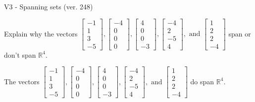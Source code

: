 \begin{exercise}
  \begin{exerciseTitle}V3 - Spanning sets (ver. 248)\end{exerciseTitle}
  \begin{exerciseStatement}
    Explain why the vectors \(\left[\begin{array}{r}
-1 \\
1 \\
3 \\
-5
\end{array}\right] , \left[\begin{array}{r}
-4 \\
0 \\
0 \\
0
\end{array}\right] , \left[\begin{array}{r}
4 \\
0 \\
0 \\
-3
\end{array}\right] , \left[\begin{array}{r}
-4 \\
2 \\
-5 \\
4
\end{array}\right] , \text{ and } \left[\begin{array}{r}
1 \\
2 \\
2 \\
-4
\end{array}\right]\) span or don't span \(\mathbb{R}^4\). 
	


  \end{exerciseStatement}
  \begin{exerciseAnswer}
   The vectors \(\left[\begin{array}{r}
-1 \\
1 \\
3 \\
-5
\end{array}\right] , \left[\begin{array}{r}
-4 \\
0 \\
0 \\
0
\end{array}\right] , \left[\begin{array}{r}
4 \\
0 \\
0 \\
-3
\end{array}\right] , \left[\begin{array}{r}
-4 \\
2 \\
-5 \\
4
\end{array}\right] , \text{ and } \left[\begin{array}{r}
1 \\
2 \\
2 \\
-4
\end{array}\right]\) 
  	 do  
	span \(\mathbb{R}^4\).
  


  \end{exerciseAnswer}
\end{exercise}